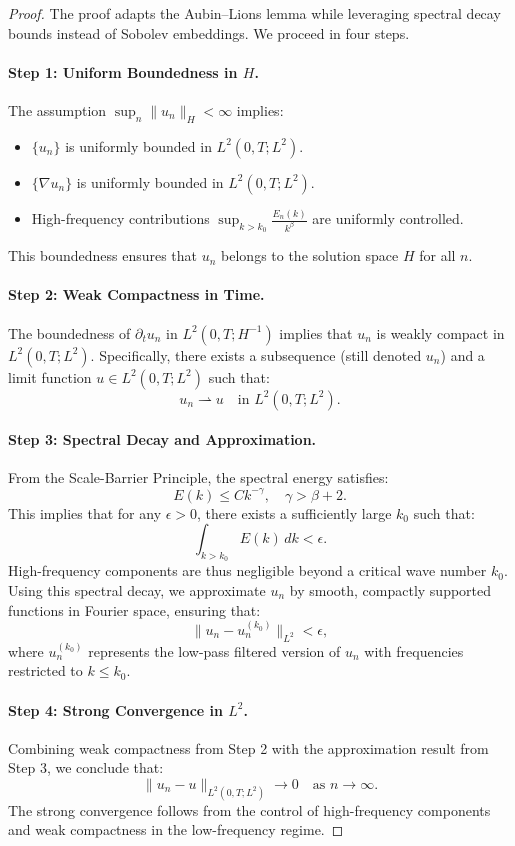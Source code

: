 \begin{proof}
The proof adapts the Aubin--Lions lemma while leveraging spectral decay bounds instead of Sobolev embeddings. We proceed in four steps.

\paragraph{Step 1: Uniform Boundedness in $H$.}
The assumption $\sup_n \|u_n\|_H < \infty$ implies:
\begin{itemize}
    \item $\{u_n\}$ is uniformly bounded in $L^2(0, T; L^2)$.
    \item $\{\nabla u_n\}$ is uniformly bounded in $L^2(0, T; L^2)$.
    \item High-frequency contributions $\sup_{k > k_0} \frac{E_n(k)}{k^\beta}$ are uniformly controlled.
\end{itemize}
This boundedness ensures that $u_n$ belongs to the solution space $H$ for all $n$.

\paragraph{Step 2: Weak Compactness in Time.}
The boundedness of $\partial_t u_n$ in $L^2(0, T; H^{-1})$ implies that $u_n$ is weakly compact in $L^2(0, T; L^2)$. Specifically, there exists a subsequence (still denoted $u_n$) and a limit function $u \in L^2(0, T; L^2)$ such that:
\[
    u_n \rightharpoonup u \quad \text{in } L^2(0, T; L^2).
\]

\paragraph{Step 3: Spectral Decay and Approximation.}
From the Scale-Barrier Principle, the spectral energy satisfies:
\[
E(k) \leq C k^{-\gamma}, \quad \gamma > \beta + 2.
\]
This implies that for any $\epsilon > 0$, there exists a sufficiently large $k_0$ such that:
\[
\int_{k > k_0} E(k) \, dk < \epsilon.
\]
High-frequency components are thus negligible beyond a critical wave number $k_0$. Using this spectral decay, we approximate $u_n$ by smooth, compactly supported functions in Fourier space, ensuring that:
\[
\|u_n - u_n^{(k_0)}\|_{L^2} < \epsilon,
\]
where $u_n^{(k_0)}$ represents the low-pass filtered version of $u_n$ with frequencies restricted to $k \leq k_0$.

\paragraph{Step 4: Strong Convergence in $L^2$.}
Combining weak compactness from Step 2 with the approximation result from Step 3, we conclude that:
\[
\|u_n - u\|_{L^2(0, T; L^2)} \to 0 \quad \text{as } n \to \infty.
\]
The strong convergence follows from the control of high-frequency components and weak compactness in the low-frequency regime.
\qedhere
\end{proof}


